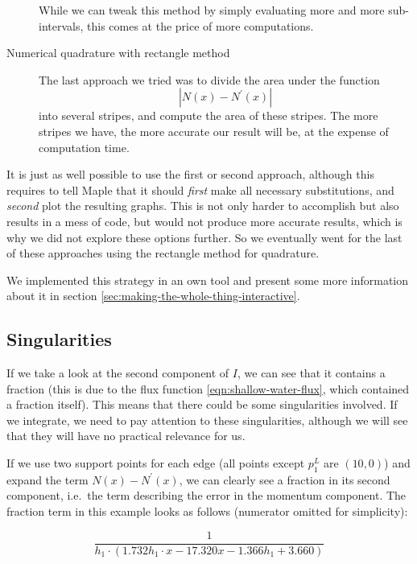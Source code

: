 \documentclass{article}
\begin{document}
\begin{description}
  While we can tweak this method by simply evaluating more and more sub-intervals, this comes at the price of more computations.
\item[Numerical quadrature with rectangle method] The last approach we tried was to divide the area under the function
  \begin{equation*}
    \left| N\left(x\right)-N^\prime\left(x\right) \right|
  \end{equation*}
  into several stripes, and compute the area of these stripes. The more stripes we have, the more accurate our result will be, at the expense of computation time.
\end{description}

It is just as well possible to use the first or second approach, although this requires to tell Maple that it should \emph{first} make all necessary substitutions, and \emph{second} plot the resulting graphs. This is not only harder to accomplish but also results in a mess of code, but would not produce more accurate results, which is why we did not explore these options further. So we eventually went for the last of these approaches using the rectangle method for quadrature.

We implemented this strategy in an own tool and present some more information about it in section \ref{sec:making-the-whole-thing-interactive}.

\subsection{Singularities}
\label{sec:singularities}

If we take a look at the second component of $I$, we can see that it contains a fraction (this is due to the flux function \ref{eqn:shallow-water-flux}, which contained a fraction itself). This means that there could be some singularities involved. If we integrate, we need to pay attention to these singularities, although we will see that they will have no practical relevance for us.

If we use two support points for each edge (all points except $p_1^L$ are $(10,0)$) and expand the term $N\left(x\right)-N^\prime\left(x\right)$, we can clearly see a fraction in its second component, i.e.\, the term describing the error in the momentum component. The fraction term in this example looks as follows (numerator omitted for simplicity):

\begin{equation*}
  \frac{1}{h_1\cdot(1.732 h_1 \cdot x - 17.320 x - 1.366 h_1 + 3.660)}
\end{equation*}
\end{document}
